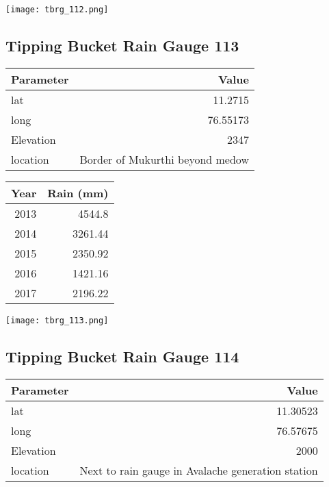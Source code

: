 \documentclass[a4paper]{article}
\begin{document}
\begin{center}
\texttt{[image: tbrg\_112.png]}
\end{center}


\newpage

\subsection*{Tipping Bucket Rain Gauge 113}
\label{sec:org4122152}

\begin{center}
\begin{tabular}{lr}
Parameter & Value\\
\hline
lat & 11.2715\\
long & 76.55173\\
Elevation & 2347\\
location & Border of Mukurthi beyond medow\\
\end{tabular}
\end{center}

\begin{center}
\begin{tabular}{rr}
Year & Rain (mm)\\
\hline
2013 & 4544.8\\
2014 & 3261.44\\
2015 & 2350.92\\
2016 & 1421.16\\
2017 & 2196.22\\
\end{tabular}
\end{center}

\begin{center}
\texttt{[image: tbrg\_113.png]}
\end{center}

\newpage

\subsection*{Tipping Bucket Rain Gauge 114}
\label{sec:org41993a9}

\begin{center}
\begin{tabular}{lr}
Parameter & Value\\
\hline
lat & 11.30523\\
long & 76.57675\\
Elevation & 2000\\
location & Next to rain gauge in Avalache generation station\\
\end{tabular}
\end{center}
\end{document}
